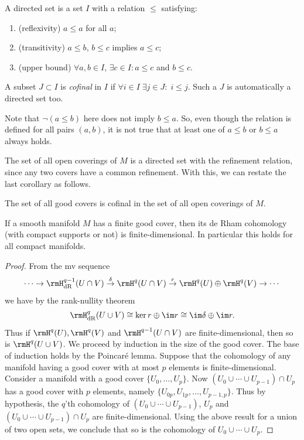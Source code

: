 \begin{defn}
    A directed set is a set $I$ with a relation $\leq $ satisfying:
    \begin{enumerate}
        \item (reflexivity) $a\leq a$ for all $a$;
        \item (transitivity) $a\leq b$, $b\leq c$ implies $a\leq c$;
        \item (upper bound) $\forall a,b\in I$, $\exists c\in I: a\leq c$ and $b\leq c$.
    \end{enumerate}
    A subset $J\subset I$ is \emph{cofinal} in $I$ if  $\forall i\in I\; \exists j\in J:\; i\leq j$. Such a $J$ is automatically a directed set too.
\end{defn}

Note that $\lnot (a\leq b)$ here does not imply $b\leq a$. So, even though the relation is defined for all pairs $(a,b)$, it is not true that at least one of $a\leq b$ or $b\leq a$ always holds.
    
The set of all open coverings of $M$ is a directed set with the refinement relation, since any two covers have a common refinement. With this, we can restate the last corollary as follows.

\begin{cor}
    The set of all good covers is cofinal in the set of all open coverings of $M$.
\end{cor}

\begin{prop}
    If a smooth manifold $M$ has a finite good cover, then its de Rham cohomology (with compact supports or not) is finite-dimensional. In particular this holds for all compact manifolds.
\end{prop}
\begin{proof}
     From the \gls{mv} sequence 
     \[\cdots\to \rmH^{q-1}_{\rm dR}(U\cap V)\overset{\delta}\to \rmH^q(U\cap V)\overset{r}\to \rmH^q(U)\oplus \rmH^q(V)\to\cdots\]
     we have by the rank-nullity theorem
     \[\rmH^q_{\rm dR}(U\cup V)\cong \ker r\oplus\im r\cong \im \delta\oplus\im r.\]
     Thus if $\rmH^q(U), \rmH^q(V)$ and $\rmH^{q-1}(U\cap V)$ are finite-dimensional, then so is $\rmH^q(U\cup V)$.
     We proceed by induction in the size of the good cover. The base of induction holds by the Poincar\'e lemma. Suppose that the cohomology of any manifold having a good cover with at most $p$ elements is finite-dimensional. Consider a manifold with a good cover $\{U_0,\ldots,U_{p}\}$. Now $(U_0\cup \cdots \cup U_{p-1})\cap U_{p}$ has a good cover with $p$ elements, namely $\{U_{0p},U_{1p},\ldots,U_{p-1,p}\}$. Thus by hypothesis, the $q$'th cohomology of $(U_0\cup \cdots \cup U_{p-1})$, $U_p$ and $(U_0\cup \cdots \cup U_{p-1})\cap U_{p}$ are finite-dimensional. Using the above result for a union of two open sets, we conclude that so is the cohomology of $U_0\cup \cdots\cup U_p$.
\end{proof}


